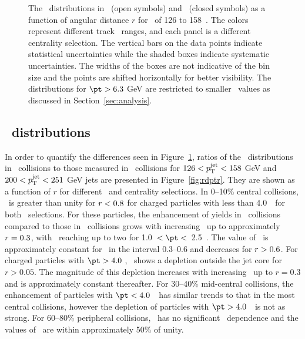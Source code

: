 \begin{figure}[h]
{\begin{tabular}{ccc}
\end{tabular}}
\caption{The \Dptr\ distributions in \pp\ (open symbols) and \pbpb\ (closed symbols) as a function of angular distance $r$ for \ptjet\ of 126 to 158~\GeV.
The colors represent different track \pt\ ranges, and each panel is a different centrality selection.
The vertical bars on the data points indicate statistical uncertainties while the shaded boxes indicate systematic uncertainties.
The widths of the boxes are not indicative of the bin size and the points are shifted horizontally for better visibility.
The distributions for $\pt > 6.3$ GeV are restricted to smaller \rvar\ values as discussed in Section~\ref{sec:analysis}.}
\label{fig:dptr}
\end{figure}



\subsection{\RDptr\ distributions}
\label{sec:rdptr}
In order to quantify the differences seen in Figure~\ref{fig:dptr}, ratios of the \Dptr\ distributions in \pbpb\ collisions to those measured in \pp\ collisions for $126 < \mbox{$p_{\mathrm{T}}^{\mathrm{jet}}$} < 158$ GeV and $200 < \mbox{$p_{\mathrm{T}}^{\mathrm{jet}}$} < 251$ GeV jets are presented in Figure~\ref{fig:rdptr}.
They are shown as a function of $r$ for different \pt\ and centrality selections.
In 0--10\% central collisions, \RDptr\ is greater than unity for $\mbox{$r$} < 0.8$ for charged particles with \pT less than 4.0~\GeV\ for both \ptjet\ selections.
For these particles, the enhancement of yields in \pbpb\ collisions compared to those in \pp\ collisions grows with increasing \rvar\ up to approximately \mbox{$\mbox{$r$}  = 0.3$}, with \RDptr\ reaching up to two for 1.0~$< \pt <$~2.5~\GeV.
The value of \RDptr\ is approximately constant for \rvar\ in the interval \mbox{0.3--0.6} and decreases for \mbox{$\mbox{$r$} > 0.6$}.
For charged particles with $\pt > 4.0$ \GeV, \RDptr\ shows a depletion outside the jet core for $r > 0.05$.
The magnitude of this depletion increases with increasing \rvar\ up to $r = 0.3$ and is approximately constant thereafter.
For 30--40\% mid-central collisions, the enhancement of particles with $\pt < 4.0$~\GeV\ has similar trends to that in the most central collisions, however the depletion of particles with $\pt > 4.0$~\GeV\ is not as strong.
For 60--80\% peripheral collisions, \RDptr\ has no significant \rvar\ dependence and the values of \RDptr\ are within approximately 50\% of unity.

